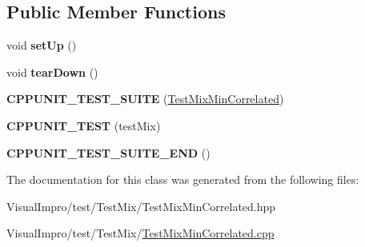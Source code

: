 \subsection*{Public Member Functions}
\begin{DoxyCompactItemize}
\item 
\mbox{\label{class_test_mix_min_correlated_a77f564435d7b9125aad8aad8118e4e6c}} 
void {\bfseries set\+Up} ()
\item 
\mbox{\label{class_test_mix_min_correlated_a3cf6762b7a43ce852507b2f4ead99530}} 
void {\bfseries tear\+Down} ()
\item 
\mbox{\label{class_test_mix_min_correlated_ac5d3f9ddf7494d4e637069eb00053e64}} 
{\bfseries C\+P\+P\+U\+N\+I\+T\+\_\+\+T\+E\+S\+T\+\_\+\+S\+U\+I\+TE} (\mbox{\hyperlink{class_test_mix_min_correlated}{Test\+Mix\+Min\+Correlated}})
\item 
\mbox{\label{class_test_mix_min_correlated_af04f744203291af2cb589f1349b9fa53}} 
{\bfseries C\+P\+P\+U\+N\+I\+T\+\_\+\+T\+E\+ST} (test\+Mix)
\item 
\mbox{\label{class_test_mix_min_correlated_a5d5020c2e1ece6483e41b799f57add8f}} 
{\bfseries C\+P\+P\+U\+N\+I\+T\+\_\+\+T\+E\+S\+T\+\_\+\+S\+U\+I\+T\+E\+\_\+\+E\+ND} ()
\end{DoxyCompactItemize}


The documentation for this class was generated from the following files\+:\begin{DoxyCompactItemize}
\item 
Visual\+Impro/test/\+Test\+Mix/Test\+Mix\+Min\+Correlated.\+hpp\item 
Visual\+Impro/test/\+Test\+Mix/\mbox{\hyperlink{_test_mix_min_correlated_8cpp}{Test\+Mix\+Min\+Correlated.\+cpp}}\end{DoxyCompactItemize}

